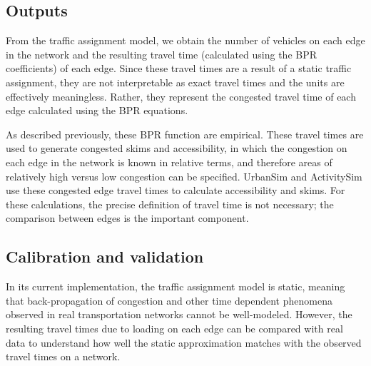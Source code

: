 \subsection{Outputs}

From the traffic assignment model, we obtain the number of vehicles on each edge in the network and the resulting travel time (calculated using the BPR coefficients) of each edge. Since these travel times are a result of a static traffic assignment, they are not interpretable as exact travel times and the units are effectively meaningless. Rather, they represent the congested travel time of each edge calculated using the BPR equations.

As described previously, these BPR function are empirical. These travel times are used to generate congested skims and accessibility, in which the congestion on each edge in the network is known in relative terms, and therefore areas of relatively high versus low congestion can be specified. UrbanSim and ActivitySim use these congested edge travel times to calculate accessibility and skims. For these calculations, the precise definition of travel time is not necessary; the comparison between edges is the important component.


\subsection{Calibration and validation}

In its current implementation, the traffic assignment model is static, meaning that back-propagation of congestion and other time dependent phenomena observed in real transportation networks cannot be well-modeled. However, the resulting travel times due to loading on each edge can be compared with real data to understand how well the static approximation matches with the observed travel times on a network. 
